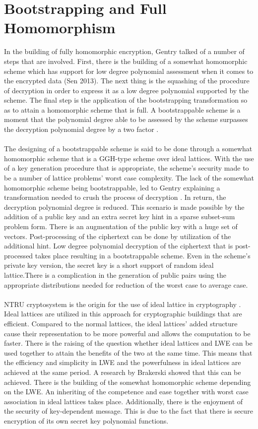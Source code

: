 \section{Bootstrapping and Full Homomorphism}
In the building of fully homomorphic encryption, Gentry talked of a number of steps that are involved. First, there is the building of a somewhat homomorphic scheme which has support for low degree polynomial assessment when it comes to the encrypted data (Sen 2013). The next thing is the squashing of the procedure of decryption in order to express it as a low degree polynomial supported by the scheme. The final step is the application of the bootstrapping transformation so as to attain a homomorphic scheme that is full. A bootstrappable scheme is a moment that the polynomial degree able to be assessed by the scheme surpasses the decryption polynomial degree by a two factor \cite{sen2013homomorphic}.\\\\
The designing of a bootstrappable scheme is said to be done through a somewhat homomorphic scheme that is a GGH-type scheme over ideal lattices. With the use of a key generation procedure that is appropriate, the scheme’s security made to be a number of lattice problems’ worst case complexity. The lack of the somewhat homomorphic scheme being bootstrappable, led to Gentry explaining a transformation needed to crush the process of decryption \cite{sen2013homomorphic}. In return, the decryption polynomial degree is reduced. This scenario is made possible by the addition of a public key and an extra secret key hint in a sparse subset-sum problem form.
There is an augmentation of the public key with a huge set of vectors. Post-processing of the ciphertext can be done by utilization of the additional hint. Low degree polynomial decryption of the ciphertext that is post-processed takes place resulting in a bootstrappable scheme. Even in the scheme’s private key version, the secret key is a short support of random ideal lattice.There is a complication in the generation of public pairs using the appropriate distributions needed for reduction of the worst case to average case.\\\\
NTRU cryptosystem is the origin for the use of ideal lattice in cryptography \cite{sen2013homomorphic}. Ideal lattices are utilized in this approach for cryptographic buildings that are efficient. Compared to the normal lattices, the ideal lattices’ added structure cause their representation to be more powerful and allows the computation to be faster.
There is the raising of the question whether ideal lattices and LWE can be used together to attain the benefits of the two at the same time. This means that the efficiency and simplicity in LWE and the powerfulness in ideal lattices are achieved at the same period. A research by Brakerski showed that this can be achieved. There is the building of the somewhat homomorphic scheme depending on the LWE. An inheriting of the competence and ease together with worst case association in ideal lattices takes place. Additionally, there is the enjoyment of the security of key-dependent message. This is due to the fact that there is secure encryption of its own secret key polynomial functions.


